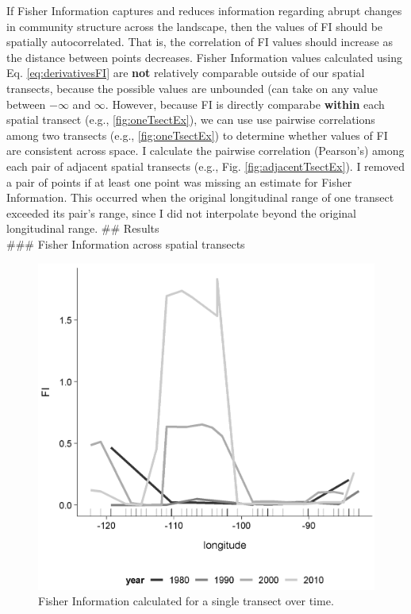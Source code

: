 \documentclass[12pt,twoside,openany]{reedthesis}
\begin{document}
If Fisher Information captures and reduces information regarding abrupt
changes in community structure across the landscape, then the values of
FI should be spatially autocorrelated. That is, the correlation of FI
values should increase as the distance between points decreases. Fisher
Information values calculated using Eq. \eqref{eq:derivativesFI} are
\textbf{not} relatively comparable outside of our spatial transects,
because the possible values are unbounded (can take on any value between
\(-\infty\) and \(\infty\). However, because FI is directly comparabe
\textbf{within} each spatial transect (e.g., \ref{fig:oneTsectEx}), we
can use use pairwise correlations among two transects (e.g.,
\ref{fig:oneTsectEx}) to determine whether values of FI are consistent
across space. I calculate the pairwise correlation (Pearson's) among
each pair of adjacent spatial transects (e.g., Fig.
\ref{fig:adjacentTsectEx}). I removed a pair of points if at least one
point was missing an estimate for Fisher Information. This occurred when
the original longitudinal range of one transect exceeded its pair's
range, since I did not interpolate beyond the original longitudinal
range. \#\# Results\\
\#\#\# Fisher Information across spatial transects
\begin{figure}
\includegraphics[width=0.85\linewidth]{./chapterFiles/fisherSpatial/figures/figsCalledInDiss/transect_12_East-West_metric_FI_Eqn7_12} \caption{Fisher Information calculated for a single transect over time.}\label{fig:fi1Tsect}
\end{figure}
\end{document}
